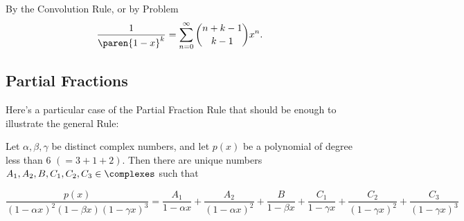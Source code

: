 \documentclass[handout]{mcs}
\begin{document}
By the Convolution Rule, or by Problem %
\[
\frac{1}{\paren{1-x}^k} = \sum_{n=0}^\infty \binom{n+k-1}{k-1}x^n.
\]

\subsection{Partial Fractions}

Here's a particular case of the Partial Fraction Rule that should be
enough to illustrate the general Rule:

Let $\alpha, \beta, \gamma$ be distinct complex numbers, and
let $p(x)$ be a polynomial of degree less than 6 $(= 3+1+2)$.  Then
there are unique numbers $A_1,A_2,B,C_1,C_2,C_3 \in \complexes$ such that

\[
\frac{p(x)}{(1-\alpha x)^2 (1-\beta x) (1-\gamma x)^3}
= \frac{A_1}{1-\alpha x} + \frac{A_2}{(1-\alpha x)^2}
+ \frac{B}{1-\beta x}
+ \frac{C_1}{1-\gamma x} + \frac{C_2}{(1-\gamma x)^2} + \frac{C_3}{(1-\gamma x)^3}
\]
\end{document}
